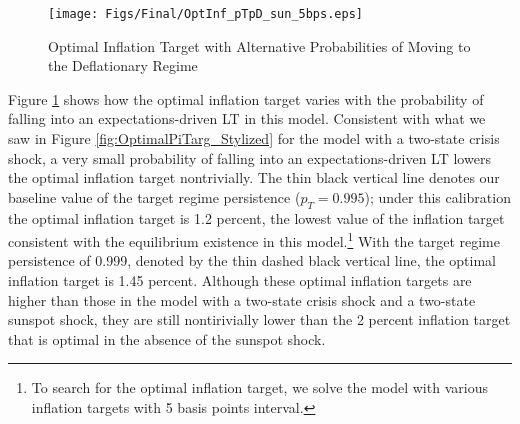 \documentclass[11pt]{article}
\begin{document}
    \begin{figure}[!h]
		\begin{center}
			\caption{Optimal Inflation Target with Alternative Probabilities of Moving to the Deflationary Regime\label{fig:OptimalPiTarg_sun}}
			\texttt{[image: Figs/Final/OptInf\_pTpD\_sun\_5bps.eps]}\\
		\end{center}
	\end{figure}

    Figure \ref{fig:OptimalPiTarg_sun} shows how the optimal inflation target varies with the probability of falling into an expectations-driven LT in this model. Consistent with what we saw in Figure \ref{fig:OptimalPiTarg_Stylized} for the model with a two-state crisis shock, a very small probability of falling into an expectations-driven LT lowers the optimal inflation target nontrivially. The thin black vertical line denotes our baseline value of the target regime persistence ($p_{T}=0.995$); under this calibration the optimal inflation target is 1.2 percent, the lowest value of the inflation target consistent with the equilibrium existence in this model.\footnote{To search for the optimal inflation target, we solve the model with various inflation targets with 5 basis points interval.} With the target regime persistence of 0.999, denoted by the thin dashed black vertical line, the optimal inflation target is 1.45 percent. Although these optimal inflation targets are higher than those in the model with a two-state crisis shock and a two-state sunspot shock, they are still nontirivially lower than the 2 percent inflation target that is optimal in the absence of the sunspot shock.





\end{document}
